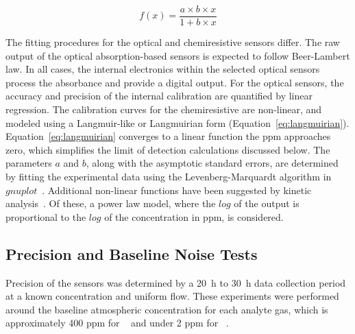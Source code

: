 \documentclass[sensors,article,submit,moreauthors,pdftex]{Definitions/mdpi}
\begin{document}
			\begin{equation}
				\label{eq:langmuirian}
				f(x)=\frac{a\times b\times x}{1+b\times x}
			\end{equation}

			The fitting procedures for the optical and chemiresistive sensors differ.
			The raw output of the optical absorption-based sensors is expected to follow Beer-Lambert law.
			In all cases, the internal electronics within the selected optical sensors process the absorbance and provide a digital output.
			For the optical sensors, the accuracy and precision of the internal calibration are quantified by linear regression.
			The calibration curves for the chemiresistive are non-linear, and modeled using a Langmuir-like or Langmuirian form (Equation~\ref{eq:langmuirian}).
			Equation~\ref{eq:langmuirian} converges to a linear function the ppm approaches zero, which simplifies the limit of detection calculations discussed below.
			The parameters $a$ and $b$, along with the asymptotic standard errors, are determined by fitting the experimental data using the Levenberg-Marquardt algorithm in $gnuplot$~\cite{williams_gnuplot_2016}.
			Additional non-linear functions have been suggested by kinetic analysis~\cite{barsan_fundamental_1999,ahlers_rate_2005}.
			Of these, a power law model, where the $log$ of the output is proportional to the $log$ of the concentration in ppm, is considered.
			
		\subsection{Precision and Baseline Noise Tests}
			\label{sec:method_baseline}
		
			Precision of the sensors was determined by a \SI{20}{\hour} to \SI{30}{\hour} data collection period at a known concentration and uniform flow.
			These experiments were performed around the baseline atmospheric concentration for each analyte gas, which is approximately 400 ppm for ~\cite{blasing_recent_2016,dlugokencky_trends_2016} and under 2 ppm for ~\cite{turner_large_2016,bamberger_spatial_2014,dlugokencky_trends_2016-1}. 
				
		
\end{document}
